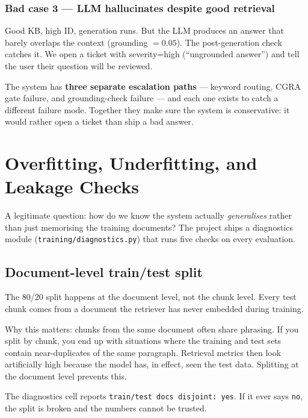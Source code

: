 \documentclass[11pt,a4paper]{article}
\begin{document}
\subsubsection*{Bad case 3 --- LLM hallucinates despite good retrieval}

Good KB, high ID, generation runs. But the LLM produces an answer that barely overlaps the context (grounding $= 0.05$). The post-generation check catches it. We open a ticket with severity=high (``ungrounded answer'') and tell the user their question will be reviewed.

\begin{keyidea}
The system has \textbf{three separate escalation paths} --- keyword routing, CGRA gate failure, and grounding-check failure --- and each one exists to catch a different failure mode. Together they make sure the system is conservative: it would rather open a ticket than ship a bad answer.
\end{keyidea}

\clearpage
\section{Overfitting, Underfitting, and Leakage Checks}

A legitimate question: how do we know the system actually \emph{generalises} rather than just memorising the training documents? The project ships a diagnostics module (\texttt{training/diagnostics.py}) that runs five checks on every evaluation.

\subsection{Document-level train/test split}

\begin{keyidea}
The 80/20 split happens at the document level, not the chunk level. Every test chunk comes from a document the retriever has never embedded during training.
\end{keyidea}

Why this matters: chunks from the same document often share phrasing. If you split by chunk, you end up with situations where the training and test sets contain near-duplicates of the same paragraph. Retrieval metrics then look artificially high because the model has, in effect, seen the test data. Splitting at the document level prevents this.

The diagnostics cell reports \texttt{train/test docs disjoint: yes}. If it ever says \texttt{no}, the split is broken and the numbers cannot be trusted.
\end{document}
